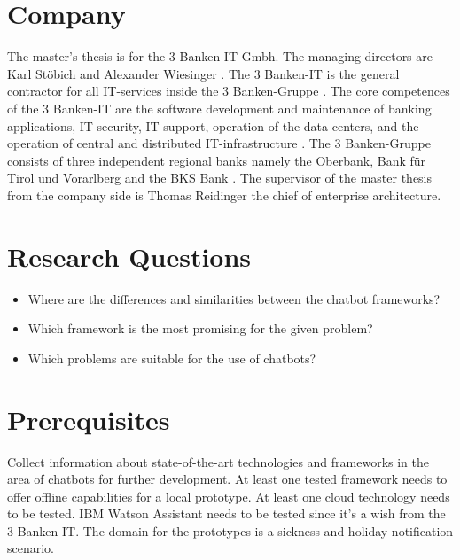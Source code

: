 \section{Company}
The master's thesis is for the 3 Banken-IT Gmbh. The managing directors are Karl St\"obich and Alexander Wiesinger \cite{3bitorgani}. 
The 3 Banken-IT is the general contractor for all IT-services inside the 3 Banken-Gruppe \cite{3bitservices}. 
The core competences of the 3 Banken-IT are the software development and maintenance of banking applications, IT-security, 
IT-support, operation of the data-centers, and the operation of central and distributed IT-infrastructure \cite{3bitservices}. 
The 3 Banken-Gruppe consists of three independent regional banks namely the Oberbank, Bank für Tirol und Vorarlberg and the BKS Bank \cite{3bitcompany}. 
The supervisor of the master thesis from the company side is Thomas Reidinger the chief of enterprise architecture.

\section{Research Questions}
\begin{itemize}
    \item Where are the differences and similarities between the chatbot frameworks?
    \item Which framework is the most promising for the given problem?
    \item Which problems are suitable for the use of chatbots?
\end{itemize}

\section{Prerequisites} \label{sec:prereq}
Collect information about state-of-the-art technologies and frameworks in the area of chatbots for further development.
At least one tested framework needs to offer offline capabilities for a local prototype.
At least one cloud technology needs to be tested.
IBM Watson Assistant needs to be tested since it's a wish from the 3 Banken-IT.
The domain for the prototypes is a sickness and holiday notification scenario.



